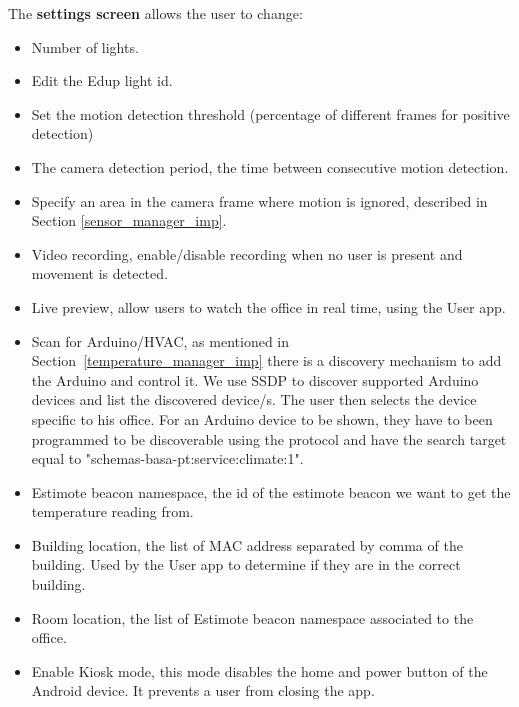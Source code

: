 The \textbf{settings screen} allows the user to change:
\begin{itemize}
  \item Number of lights.
  \item Edit the Edup light id.
  
  \item Set the motion detection threshold (percentage of different frames for positive detection)
  
  \item The camera detection period, the time between consecutive motion detection.
  
  \item Specify an area in the camera frame where motion is ignored, described in Section \ref{sensor_manager_imp}. 
  
  \item Video recording, enable/disable recording when no user is present and movement is detected.
  
  \item Live preview, allow users to watch the office in real time, using the User app.
  
  \item Scan for Arduino/HVAC, as mentioned in Section~\ref{temperature_manager_imp} there is a discovery mechanism to add the Arduino and control it. We use \ac{SSDP} to discover supported Arduino devices and list the discovered device/s. The user then selects the device specific to his office.
  For an Arduino device to be shown, they have to been programmed to be discoverable using the protocol and have the search target equal to "schemas-basa-pt:service:climate:1".
  
  \item Estimote beacon namespace, the id of the estimote beacon we want to get the temperature reading from.
  
  \item Building location, the list of \ac{MAC} address separated by comma of the building. Used by the User app to determine if they are in the correct building.
  
  \item Room location, the list of Estimote beacon namespace associated to the office.
  
  
  \item Enable Kiosk mode, this mode disables the home and power button of the Android device. It prevents a user from closing the app. 
    
  
\end{itemize}


